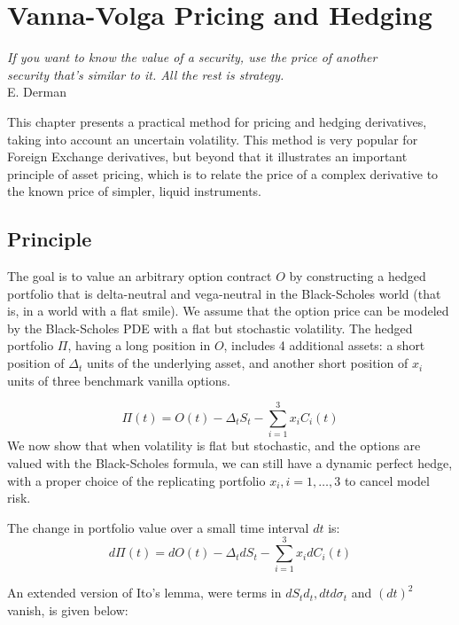 \documentclass[]{tufte-book}
\date{}
\begin{document}
{
\setcounter{tocdepth}{0}
\tableofcontents
}

\hypertarget{vanna-volga-pricing-and-hedging}{%
\chapter{Vanna-Volga Pricing and Hedging}\label{vanna-volga-pricing-and-hedging}}

{\emph{If you want to know the value of a security, use the price of another\\
security that's similar to it. All the rest is strategy.}}\\
E. Derman

This chapter presents a practical method for pricing and hedging
derivatives, taking into account an uncertain volatility. This method is
very popular for Foreign Exchange derivatives, but beyond that it
illustrates an important principle of asset pricing, which is to relate
the price of a complex derivative to the known price of simpler, liquid
instruments.

\hypertarget{principle}{%
\section{Principle}\label{principle}}

The goal is to value an arbitrary option contract \(O\) by constructing a hedged
portfolio that is delta-neutral and vega-neutral in the Black-Scholes world (that is, in a world with a flat smile). We assume that the option price can be modeled by the Black-Scholes PDE with a flat but stochastic volatility. The hedged portfolio \(\Pi\), having a long position in \(O\), includes 4 additional assets: a short position of \(\Delta_t\) units of the underlying asset, and another short position of \(x_i\) units of three benchmark vanilla options.

\[
\Pi(t) = O(t) - \Delta_t S_t - \sum_{i=1}^3 x_i C_i(t)
\]
We now show that when volatility is flat but stochastic, and the options are valued with the Black-Scholes formula, we can still have a dynamic perfect hedge, with a proper choice of the replicating portfolio \(x_i, i=1, \ldots, 3\) to cancel model risk.

The change in portfolio value over a small time interval \(dt\) is:
\[
d\Pi(t) = dO(t) - \Delta_t dS_t -\sum_{i=1}^3 x_i dC_i(t)
\]

An extended version of Ito's lemma, were terms in \(dS_td_t, dtd\sigma_t\) and \((dt)^2\) vanish, is given below:
\end{document}
